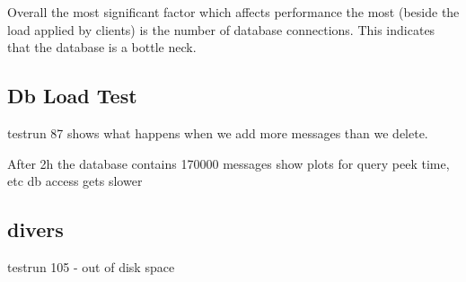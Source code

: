 \documentclass[milestone1.tex]{subfiles}
\begin{document}
Overall the most significant factor which affects performance the most (beside the load applied by clients) is the number of database connections. This indicates that the database is a bottle neck.

\subsection{Db Load Test}

testrun 87 shows what happens when we add more messages than we delete. 

After 2h the database contains 170000 messages
show plots for query peek time, etc
db access gets slower

\subsection{divers}

testrun 105 - out of disk space
\end{document}
